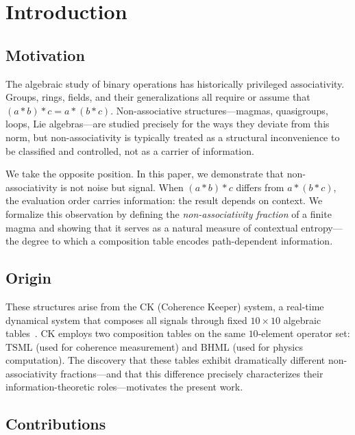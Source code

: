 \documentclass[11pt,a4paper]{article}
\theoremstyle{definition}
\theoremstyle{remark}
\newcommand{\TSML}{\mathrm{TSML}}
\newcommand{\BHML}{\mathrm{BHML}}
\begin{document}
\section{Introduction}\label{sec:intro}

\subsection{Motivation}\label{sec:motivation}

The algebraic study of binary operations has historically privileged associativity. Groups, rings, fields, and their generalizations all require or assume that $(a \ast b)\ast c = a \ast (b\ast c)$. Non-associative structures---magmas, quasigroups, loops, Lie algebras---are studied precisely for the ways they deviate from this norm, but non-associativity is typically treated as a structural inconvenience to be classified and controlled, not as a carrier of information.

We take the opposite position. In this paper, we demonstrate that non-associativity is not noise but signal. When $(a\ast b)\ast c$ differs from $a\ast (b\ast c)$, the evaluation order carries information: the result depends on context. We formalize this observation by defining the \emph{non-associativity fraction} of a finite magma and showing that it serves as a natural measure of contextual entropy---the degree to which a composition table encodes path-dependent information.

\subsection{Origin}\label{sec:origin}

These structures arise from the CK (Coherence Keeper) system, a real-time dynamical system that composes all signals through fixed $10\times 10$ algebraic tables~\cite{Sanders2026a}. CK employs two composition tables on the same $10$-element operator set: $\TSML$ (used for coherence measurement) and $\BHML$ (used for physics computation). The discovery that these tables exhibit dramatically different non-associativity fractions---and that this difference precisely characterizes their information-theoretic roles---motivates the present work.

\subsection{Contributions}\label{sec:contributions}
\end{document}
